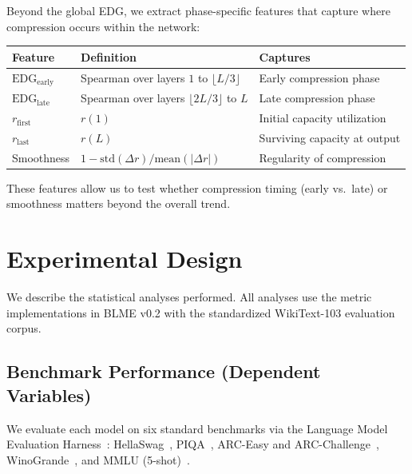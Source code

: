 \documentclass{article}
\begin{document}
Beyond the global EDG, we extract phase-specific features that capture where compression occurs within the network:

\begin{table}[h]
\centering
\small
\begin{tabular}{@{}lll@{}}
\toprule
\textbf{Feature} & \textbf{Definition} & \textbf{Captures} \\
\midrule
$\text{EDG}_{\text{early}}$ & Spearman over layers $1$ to $\lfloor L/3 \rfloor$ & Early compression phase \\
$\text{EDG}_{\text{late}}$ & Spearman over layers $\lfloor 2L/3 \rfloor$ to $L$ & Late compression phase \\
$r_{\text{first}}$ & $r(1)$ & Initial capacity utilization \\
$r_{\text{last}}$ & $r(L)$ & Surviving capacity at output \\
Smoothness & $1 - \text{std}(\Delta r) / \text{mean}(|\Delta r|)$ & Regularity of compression \\
\bottomrule
\end{tabular}
\end{table}

\noindent These features allow us to test whether compression timing (early vs.\ late) or smoothness matters beyond the overall trend.

\section{Experimental Design}
\label{sec:experiments}

We describe the statistical analyses performed. All analyses use the metric implementations in BLME v0.2 with the standardized WikiText-103 evaluation corpus.

\subsection{Benchmark Performance (Dependent Variables)}
\label{sec:benchmarks}

We evaluate each model on six standard benchmarks via the Language Model Evaluation Harness~\citep{eval-harness}: HellaSwag~\citep{zellers2019hellaswag}, PIQA~\citep{bisk2020piqa}, ARC-Easy and ARC-Challenge~\citep{clark2018arc}, WinoGrande~\citep{sakaguchi2021winogrande}, and MMLU (5-shot)~\citep{hendrycks2021measuring}.
\end{document}
